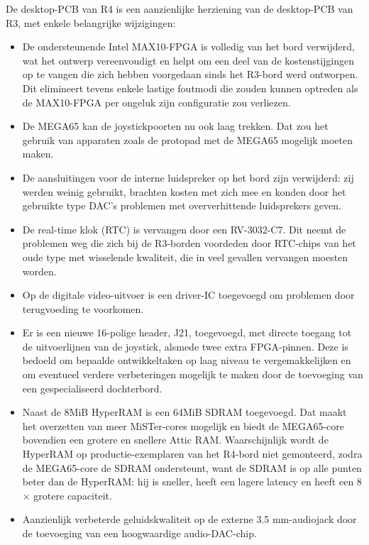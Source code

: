De desktop-PCB van R4 is een aanzienlijke herziening van de desktop-PCB van R3, met enkele belangrijke wijzigingen:

\begin{itemize}
\item De ondersteunende Intel\texttrademark{} MAX10\texttrademark{}-FPGA is volledig van het bord verwijderd, wat het ontwerp vereenvoudigt en helpt om een deel van de kostenstijgingen op te vangen die zich hebben voorgedaan sinds het R3-bord werd ontworpen. Dit elimineert tevens enkele lastige foutmodi die zouden kunnen optreden als de MAX10-FPGA per ongeluk zijn configuratie zou verliezen.\item De MEGA65 kan de joystickpoorten nu ook laag trekken. Dat zou het gebruik van apparaten zoals de protopad\texttrademark{} met de MEGA65 mogelijk moeten maken.\item De aansluitingen voor de interne luidspreker op het bord zijn verwijderd: zij werden weinig gebruikt, brachten kosten met zich mee en konden door het gebruikte type DAC's problemen met oververhittende luidsprekers geven.\item De real-time klok (RTC) is vervangen door een RV-3032-C7. Dit neemt de problemen weg die zich bij de R3-borden voordeden door RTC-chips van het oude type met wisselende kwaliteit, die in veel gevallen vervangen moesten worden.\item Op de digitale video-uitvoer is een driver-IC toegevoegd om problemen door terugvoeding te voorkomen.\item Er is een nieuwe 16-polige header, J21, toegevoegd, met directe toegang tot de uitvoerlijnen van de joystick, alsmede twee extra FPGA-pinnen. Deze is bedoeld om bepaalde ontwikkeltaken op laag niveau te vergemakkelijken en om eventueel verdere verbeteringen mogelijk te maken door de toevoeging van een gespecialiseerd dochterbord.\item Naast de 8MiB HyperRAM is een 64MiB SDRAM toegevoegd. Dat maakt het overzetten van meer MiSTer-cores mogelijk en biedt de MEGA65-core bovendien een grotere en snellere Attic RAM. Waarschijnlijk wordt de HyperRAM op productie-exemplaren van het R4-bord niet gemonteerd, zodra de MEGA65-core de SDRAM ondersteunt, want de SDRAM is op alle punten beter dan de HyperRAM: hij is sneller, heeft een lagere latency en heeft een 8$\times$ grotere capaciteit.  \item Aanzienlijk verbeterde geluidskwaliteit op de externe 3.5 mm-audiojack door de toevoeging van een hoogwaardige audio-DAC-chip.
\end{itemize}

